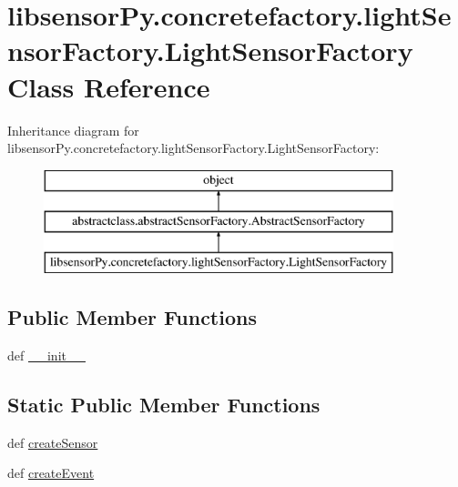 \hypertarget{classlibsensorPy_1_1concretefactory_1_1lightSensorFactory_1_1LightSensorFactory}{}\section{libsensor\+Py.\+concretefactory.\+light\+Sensor\+Factory.\+Light\+Sensor\+Factory Class Reference}
\label{classlibsensorPy_1_1concretefactory_1_1lightSensorFactory_1_1LightSensorFactory}
Inheritance diagram for libsensor\+Py.\+concretefactory.\+light\+Sensor\+Factory.\+Light\+Sensor\+Factory\+:\begin{figure}[H]
\begin{center}
\leavevmode
\includegraphics[height=3.000000cm]{classlibsensorPy_1_1concretefactory_1_1lightSensorFactory_1_1LightSensorFactory}
\end{center}
\end{figure}
\subsection*{Public Member Functions}
\begin{DoxyCompactItemize}
\item 
def \hyperlink{classlibsensorPy_1_1concretefactory_1_1lightSensorFactory_1_1LightSensorFactory_acbde086dbbaa33d48400007b0c97db42}{\+\_\+\+\_\+init\+\_\+\+\_\+}
\end{DoxyCompactItemize}
\subsection*{Static Public Member Functions}
\begin{DoxyCompactItemize}
\item 
def \hyperlink{classlibsensorPy_1_1concretefactory_1_1lightSensorFactory_1_1LightSensorFactory_a540ba13b29b7d5bff3585d7e93612262}{create\+Sensor}
\item 
def \hyperlink{classlibsensorPy_1_1concretefactory_1_1lightSensorFactory_1_1LightSensorFactory_a1d54d470c98071138ebda69a27c0c9e3}{create\+Event}
\end{DoxyCompactItemize}


